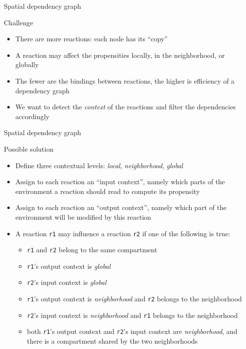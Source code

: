 \documentclass[presentation]{beamer}
\begin{document}
\begin{frame}{Spatial dependency graph}
 \begin{block}{Challenge}
  \begin{itemize}
   \item There are more reactions: each node has its ``copy''
   \item A reaction may affect the propensities locally, in the neighborhood, or globally
   \item The fewer are the bindings between reactions, the higher is efficiency of a dependency graph
   \item We want to detect the \emph{context} of the reactions and filter the dependencies accordingly
  \end{itemize}
 \end{block}
\end{frame}

\begin{frame}{Spatial dependency graph}
 \begin{block}{Possible solution}
  \begin{itemize}
   \item Define three contextual levels: \emph{local}, \emph{neighborhood}, \emph{global}
   \item Assign to each reaction an ``input context'', namely which parts of the environment a reaction should read to compute its propensity
   \item Assign to each reaction an ``output context'', namely which part of the environment will be modified by this reaction
   \item A reaction \texttt{r1} may influence a reaction \texttt{r2} if one of the following is true:
   \begin{itemize}
    \item \texttt{r1} and \texttt{r2} belong to the same compartment
    \item \texttt{r1}'s output context is \emph{global}
    \item \texttt{r2}'s input context is \emph{global}
    \item \texttt{r1}'s output context is \emph{neighborhood} and \texttt{r2} belongs to the neighborhood
    \item \texttt{r2}'s input context is \emph{neighborhood} and \texttt{r1} belongs to the neighborhood
    \item both \texttt{r1}'s output context and \texttt{r2}'s input context are \emph{neighborhood}, and there is a compartment shared by the two neighborhoods
   \end{itemize}
  \end{itemize}
 \end{block}
\end{frame}
\end{document}
